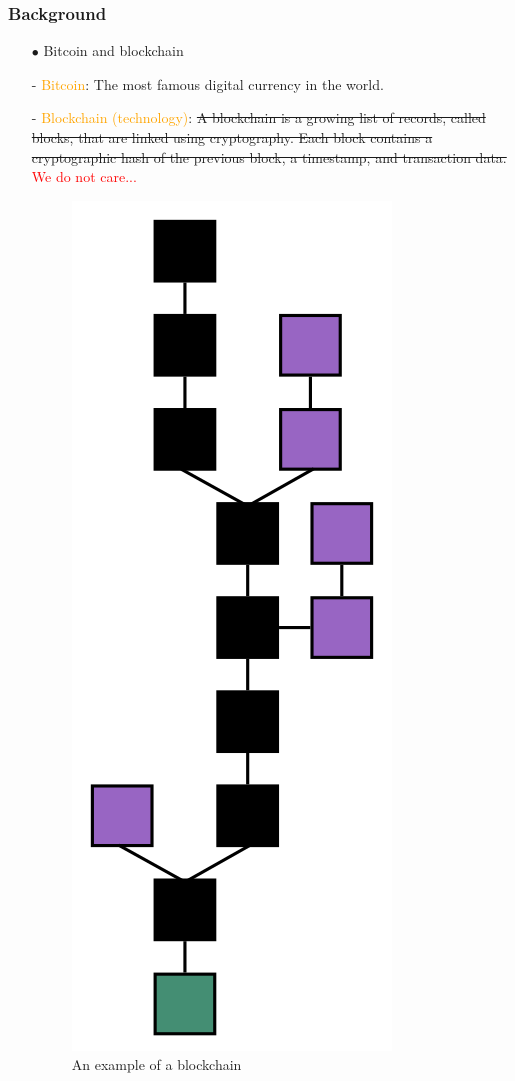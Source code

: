 \documentclass{beamer}
\begin{document}
\begin{frame}\frametitle{Background} 
\begin{enumerate}
	\item[$\bullet$] Bitcoin and blockchain
	\item[] - \textcolor{orange}{Bitcoin}: The most famous digital currency in the world.
	\item[] - \textcolor{orange}{Blockchain (technology)}: \sout{A blockchain is a growing list of records, called blocks, that are linked using cryptography. Each block contains a cryptographic hash of the previous block, a timestamp, and transaction data.} \textcolor{red}{We do not care...}
	\begin{figure}
		\includegraphics[scale=0.3, angle=270]{myfigs/wikipedia-Blockchain.jpg}
		\caption{An example of a blockchain}
	\end{figure}
\end{enumerate}
\end{frame}
\end{document}
